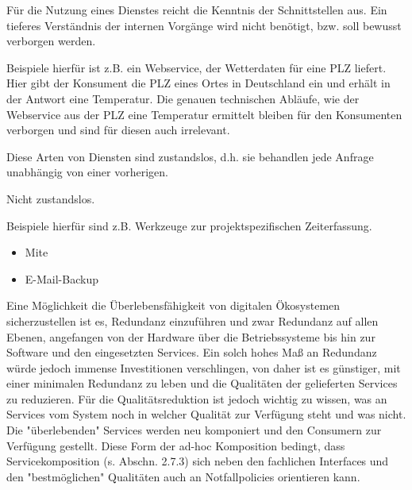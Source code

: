 
Für die Nutzung eines Dienstes reicht die Kenntnis der Schnittstellen aus. Ein tieferes Verständnis der internen Vorgänge wird nicht benötigt, bzw. soll bewusst verborgen werden. \cite{hhxmlwssoa}

Beispiele hierfür ist z.B. ein Webservice, der Wetterdaten für eine PLZ liefert. Hier gibt der Konsument die PLZ eines Ortes in Deutschland ein und erhält in der Antwort eine Temperatur. Die genauen technischen Abläufe, wie der Webservice aus der PLZ eine Temperatur ermittelt bleiben für den Konsumenten verborgen und sind für diesen auch irrelevant.

Diese Arten von Diensten sind zustandslos, d.h. sie behandlen jede Anfrage unabhängig von einer vorherigen.


Nicht zustandslos.

Beispiele hierfür sind z.B. Werkzeuge zur projektspezifischen Zeiterfassung. 


\begin{itemize}
\item Mite
\item E-Mail-Backup
\end{itemize}


Eine Möglichkeit die Überlebensfähigkeit von digitalen Ökosystemen sicherzustellen ist es, Redundanz einzuführen und zwar Redundanz auf allen Ebenen, angefangen von der Hardware über die Betriebssysteme bis hin zur Software und den eingesetzten Services. Ein solch hohes Maß an Redundanz würde jedoch immense Investitionen verschlingen, von daher ist es günstiger, mit einer minimalen Redundanz zu leben und die Qualitäten der gelieferten Services zu reduzieren. Für die Qualitätsreduktion ist jedoch wichtig zu wissen, was an Services vom System noch in welcher Qualität zur Verfügung steht und was nicht. Die "überlebenden" Services werden neu komponiert und den Consumern zur Verfügung gestellt. Diese Form der ad-hoc Komposition bedingt, dass Servicekomposition (s. Abschn. 2.7.3) sich neben den fachlichen Interfaces und den "bestmöglichen" Qualitäten auch an Notfallpolicies orientieren kann. \cite{mkulss}
